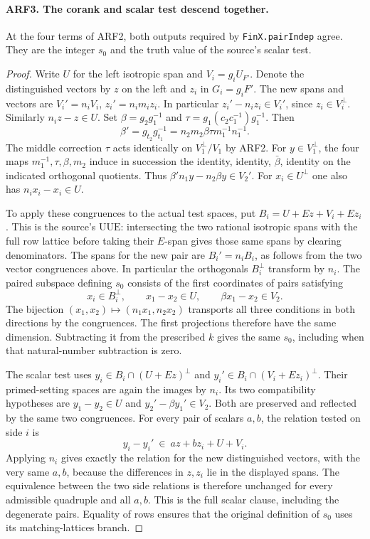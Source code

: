 \paragraph{ARF3. The corank and scalar test descend together.}
At the four terms of ARF2, both outputs required by
\texttt{FinX.pairIndep} agree. They are the integer $s_0$ and
the truth value of the source's scalar test.
\begin{proof}
Write $U$ for the left isotropic span and $V_i=g_i U_{F'}$.
Denote the distinguished vectors by $z$ on the left and $z_i$
in $G_i=g_iF'$. The new spans and vectors are
$V_i'=n_i V_i$, $z_i'=n_i m_i z_i$.
In particular $z_i'-n_i z_i\in V_i'$, since
$z_i\in V_i^\perp$. Similarly $n_i z-z\in U$.
Set $\beta=g_2g_1^{-1}$ and
$\tau=g_1(c_2c_1^{-1})g_1^{-1}$. Then
\[
 \beta'=g_{t_2}g_{t_1}^{-1}
      =n_2m_2\beta\tau m_1^{-1}n_1^{-1}.
\]
The middle correction $\tau$ acts identically on
$V_1^\perp/V_1$ by ARF2. For $y\in V_1^\perp$, the four maps
$m_1^{-1},\tau,\beta,m_2$ induce in succession the identity,
identity, $\bar\beta$, identity on the indicated orthogonal
quotients. Thus
$\beta'n_1 y-n_2\beta y\in V_2'$. For $x_i\in U^\perp$
one also has $n_i x_i-x_i\in U$.

To apply these congruences to the actual test spaces, put
$B_i=U+Ez+V_i+Ez_i$. This is the source's $\mathrm{UUE}$:
intersecting the two rational isotropic spans with the full row
lattice before taking their $E$-span gives those same spans by
clearing denominators. The spans for the new pair are $B_i'=n_iB_i$,
as follows from the two vector congruences above. In particular
the orthogonals $B_i^\perp$ transform by $n_i$. The paired subspace
defining $s_0$ consists of the first coordinates of pairs satisfying
\[
 x_i\in B_i^\perp,\qquad x_1-x_2\in U,\qquad
                   \beta x_1-x_2\in V_2.
\]
The bijection $(x_1,x_2)\mapsto(n_1x_1,n_2x_2)$ transports all
three conditions in both directions by the congruences. The first
projections therefore have the same dimension. Subtracting it from
the prescribed $k$ gives the same $s_0$, including when that
natural-number subtraction is zero.

The scalar test uses $y_i\in B_i\cap(U+Ez)^\perp$ and
$y_i'\in B_i\cap(V_i+Ez_i)^\perp$. Their primed-setting spaces
are again the images by $n_i$. Its two compatibility hypotheses
are $y_1-y_2\in U$ and $y_2'-\beta y_1'\in V_2$.
Both are preserved and reflected by the same two congruences.
For every pair of scalars $a,b$, the relation tested on side $i$ is
\[
            y_i-y_i'\ \in\ az+bz_i+U+V_i .
\]
Applying $n_i$ gives exactly the relation for the new distinguished
vectors, with the very same $a,b$, because the differences in $z,z_i$
lie in the displayed spans. The equivalence between the two side
relations is therefore unchanged for every admissible quadruple
and all $a,b$. This is the full scalar clause, including the
degenerate pairs. Equality of rows ensures that the original
definition of $s_0$ uses its matching-lattices branch.
\end{proof}

